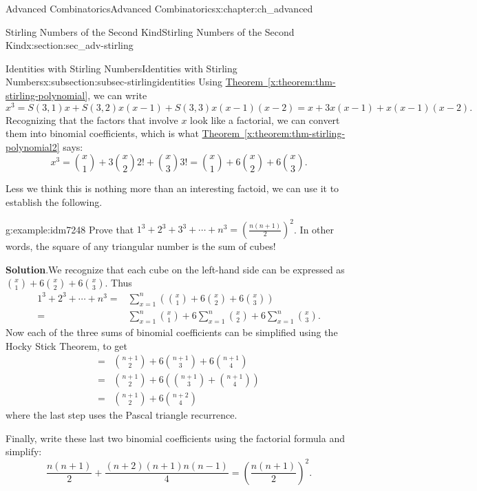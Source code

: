 \documentclass[oneside,10pt,]{book}
\numberwithin{equation}{chapter}
\newcommand{\amp}{&}
\begin{document}
\begin{chapterptx}{Advanced Combinatorics}{}{Advanced Combinatorics}{}{}{x:chapter:ch_advanced}
\begin{sectionptx}{Stirling Numbers of the Second Kind}{}{Stirling Numbers of the Second Kind}{}{}{x:section:sec_adv-stirling}
\begin{subsectionptx}{Identities with Stirling Numbers}{}{Identities with Stirling Numbers}{}{}{x:subsection:subsec-stirlingidentities}
Using \hyperref[x:theorem:thm-stirling-polynomial]{Theorem~\ref{x:theorem:thm-stirling-polynomial}}, we can write%
\begin{equation*}
x^3 = S(3,1)x + S(3,2)x(x-1) + S(3,3)x(x-1)(x-2) = x + 3x(x-1) + x(x-1)(x-2)\text{.}
\end{equation*}
Recognizing that the factors that involve \(x\) look like a factorial, we can convert them into binomial coefficients, which is what \hyperref[x:theorem:thm-stirling-polynomial2]{Theorem~\ref{x:theorem:thm-stirling-polynomial2}} says:%
\begin{equation*}
x^3 = \binom{x}{1} + 3\binom{x}{2}2! + \binom{x}{3}3! = \binom{x}{1} + 6\binom{x}{2} + 6 \binom{x}{3}.
\end{equation*}
%
\par
Less we think this is nothing more than an interesting factoid, we can use it to establish the following.%
\begin{example}{}{g:example:idm7248}%
Prove that \(1^3 + 2^3 + 3^3 + \cdots + n^3 = \left(\frac{n(n+1)}{2}\right)^2\).  In other words, the square of any triangular number is the sum of cubes!%
\par\smallskip%
\noindent\textbf{Solution}.\hypertarget{g:solution:idm7252}{}\quad{}We recognize that each cube on the left-hand side can be expressed as \(\binom{x}{1} + 6 \binom{x}{2} + 6\binom{x}{3}\).  Thus%
\begin{align*}
1^3 + 2^3 + \cdots + n^3 = \amp \sum_{x=1}^n \left(\binom{x}{1} + 6 \binom{x}{2} + 6\binom{x}{3}\right)\\
= \amp \sum_{x=1}^n \binom{x}{1} + 6 \sum_{x=1}^n \binom{x}{2} + 6 \sum_{x=1}^n \binom{x}{3}\text{.}
\end{align*}
Now each of the three sums of binomial coefficients can be simplified using the Hocky Stick Theorem, to get%
\begin{align*}
=  \amp \binom{n+1}{2} + 6 \binom{n+1}{3} + 6 \binom{n+1}{4} \\
= \amp \binom{n+1}{2} + 6\left(\binom{n+1}{3}+\binom{n+1}{4}\right) \\
= \amp \binom{n+1}{2} + 6\binom{n+2}{4} 
\end{align*}
where the last step uses the Pascal triangle recurrence.%
\par
Finally, write these last two binomial coefficients using the factorial formula and simplify:%
\begin{equation*}
\frac{n(n+1)}{2} + \frac{(n+2)(n+1)n(n-1)}{4} = \left(\frac{n(n+1)}{2}\right)^2\text{.}
\end{equation*}

\end{example}
\end{subsectionptx}
\end{sectionptx}
\end{chapterptx}
\end{document}
